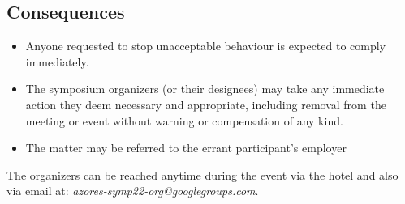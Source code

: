 \subsection{Consequences}

\begin{itemize}[noitemsep,topsep=0pt,parsep=0pt,partopsep=0pt]  

\item Anyone requested to stop unacceptable behaviour is expected to
  comply immediately.
  
\item The symposium organizers (or their designees) may take any
  immediate action they deem necessary and appropriate, including
  removal from the meeting or event without warning or compensation of
  any kind. 
\item The matter may be referred to the errant participant's employer

\end{itemize}

The organizers can be reached anytime during the event via the hotel and
also via email at: \emph{azores-symp22-org@googlegroups.com}.